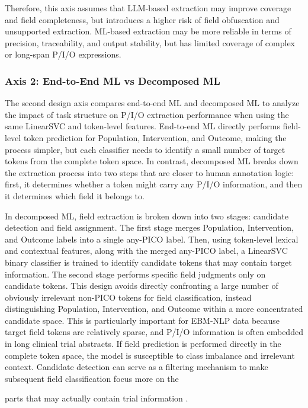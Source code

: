 \documentclass{article}
\begin{document}
Therefore, this axis assumes that LLM-based extraction may improve coverage and field completeness, but introduces a higher risk of field obfuscation and unsupported extraction. ML-based extraction may be more reliable in terms of precision, traceability, and output stability, but has limited coverage of complex or long-span P/I/O expressions.

\subsubsection{Axis 2: End-to-End ML vs Decomposed ML}
The second design axis compares end-to-end ML and decomposed ML to analyze the impact of task structure on P/I/O extraction performance when using the same LinearSVC and token-level features. End-to-end ML directly performs field-level token prediction for Population, Intervention, and Outcome, making the process simpler, but each classifier needs to identify a small number of target tokens from the complete token space. In contrast, decomposed ML breaks down the extraction process into two steps that are closer to human annotation logic: first, it determines whether a token might carry any P/I/O information, and then it determines which field it belongs to.


In decomposed ML, field extraction is broken down into two stages: candidate detection and field assignment. The first stage merges Population, Intervention, and Outcome labels into a single any-PICO label. Then, using token-level lexical and contextual features, along with the merged any-PICO label, a LinearSVC binary classifier is trained to identify candidate tokens that may contain target information. The second stage performs specific field judgments only on candidate tokens. This design avoids directly confronting a large number of obviously irrelevant non-PICO tokens for field classification, instead distinguishing Population, Intervention, and Outcome within a more concentrated candidate space. This is particularly important for EBM-NLP data because target field tokens are relatively sparse, and P/I/O information is often embedded in long clinical trial abstracts. If field prediction is performed directly in the complete token space, the model is susceptible to class imbalance and irrelevant context. Candidate detection can serve as a filtering mechanism to make subsequent field classification focus more on the

parts that may actually contain trial information \cite{hu_towards_2023}.
\end{document}
